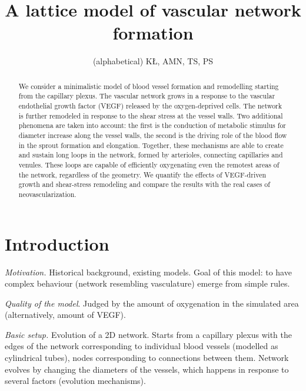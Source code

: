 \documentclass[aps,pra,a4paper,twocolumn,10pt,superscriptaddress,longbibliography]{revtex4-1}
\begin{document}
\title{A lattice model of vascular network formation}


\author{(alphabetical) K\L, AMN, TS, PS}

\begin{abstract}
We consider a minimalistic model of blood vessel formation and remodelling starting from the capillary plexus. The vascular network grows in a response to the vascular endothelial growth factor (VEGF) released by the oxygen-deprived cells. The network is further remodeled in response to the shear stress at the vessel walls. Two additional phenomena are taken into account: the first is the conduction of metabolic stimulus for diameter increase along the vessel walls, the second is the driving role of the blood flow in the sprout formation and elongation. Together, these mechanisms are able to create and sustain long loops in the network, formed by arterioles, connecting capillaries and venules. These loops are  capable of efficiently oxygenating even the remotest areas of the network, regardless of the geometry. We quantify the effects of VEGF-driven growth and shear-stress remodeling and compare the results with the real cases of neovascularization.
\end{abstract}

\maketitle





\section{Introduction}
\label{sec:intro}
%
\emph{Motivation.} Historical background, existing models. Goal of this model: to have complex behaviour (network resembling vasculature) emerge from simple rules.

%
\emph{Quality of the model}. Judged by the amount of oxygenation in the simulated area (alternatively, amount of VEGF).

%
\emph{Basic setup.} Evolution of a 2D network. Starts from a capillary plexus with the edges of the network corresponding to individual blood vessels (modelled as cylindrical tubes), nodes corresponding to connections between them. Network evolves by changing the diameters of the vessels, which happens in response to several factors (evolution mechanisms).
\end{document}
